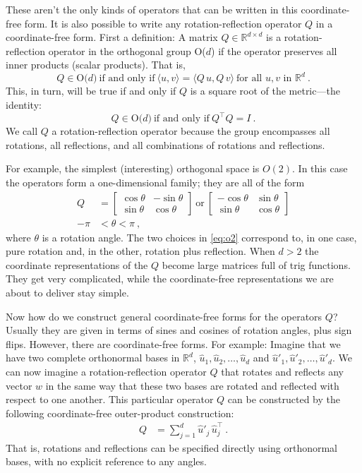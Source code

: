 \documentclass{article}
\newcommand{\inner}[2]{\langle{#1},{#2}\rangle}
\begin{document}
These aren't the only kinds of operators that can be written in this coordinate-free form.
It is also possible to write any rotation-reflection operator $Q$ in a coordinate-free form.
First a definition: A matrix $Q\in\mathbb{R}^{d\times d}$ is a rotation-reflection operator in the orthogonal group O($d$) if the operator preserves all inner products (scalar products).
That is,
\begin{equation}
    Q \in \mbox{O($d$)} ~ \mbox{if and only if} ~ \inner{u}{v}=\inner{Q\,u}{Q\,v} ~ \mbox{for all $u,v$ in $\mathbb{R}^d$} ~ .
\end{equation}
This, in turn, will be true if and only if $Q$ is a square root of the metric---the identity:
\begin{equation}
    Q \in \mbox{O($d$)} ~ \mbox{if and only if} ~ Q^\top Q=I ~ .
\end{equation}
We call $Q$ a rotation-reflection operator because the group encompasses all rotations, all reflections, and all combinations of rotations and reflections.

For example, the simplest (interesting) orthogonal space is $O(2)$. In this case the operators form a one-dimensional family; they are all of the form
\begin{align}
    Q &= \begin{bmatrix}\cos{\theta} & -\sin{\theta} \\ \sin{\theta} & \cos{\theta}\end{bmatrix} ~\mbox{or}~
    \begin{bmatrix}-\cos{\theta} & \sin{\theta} \\ \sin{\theta} & \cos{\theta}\end{bmatrix} \label{eq:o2}
    \\
    -\pi &< \theta < \pi ~,
\end{align}
where $\theta$ is a rotation angle.
The two choices in \eqref{eq:o2} correspond to, in one case, pure rotation and, in the other, rotation plus reflection.
When $d>2$ the coordinate representations of the $Q$ become large matrices full of trig functions.
They get very complicated, while the coordinate-free representations we are about to deliver stay simple.

Now how do we construct general coordinate-free forms for the operators $Q$?
Usually they are given in terms of sines and cosines of rotation angles, plus sign flips.
However, there are coordinate-free forms.
For example: Imagine that we have two complete orthonormal bases in $\mathbb{R}^d$, $\hat{u}_1,\hat{u}_2,\ldots,\hat{u}_d$ and $\hat{u}'_1,\hat{u}'_2,\ldots,\hat{u}'_d$.
We can now imagine a rotation-reflection operator $Q$ that rotates and reflects any vector $w$ in the same way that these two bases are rotated and reflected with respect to one another.
This particular operator $Q$ can be constructed by the following coordinate-free outer-product construction:
\begin{align}
    Q &= \sum_{j=1}^d \hat{u}'_j\,\hat{u}_j^\top ~.
\end{align}
That is, rotations and reflections can be specified directly using orthonormal bases, with no explicit reference to any angles.
\end{document}
